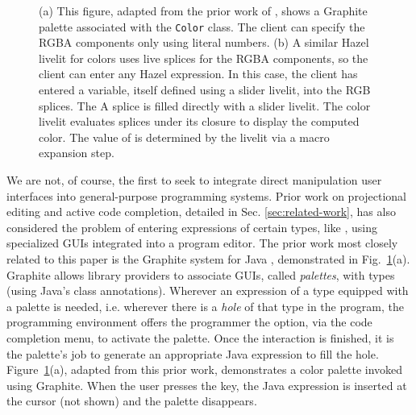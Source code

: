 \begin{figure}
  \caption{
  (a) This figure, adapted from the prior work of \citet{Graphite},
  shows a Graphite palette associated with the \texttt{Color} class.
  The client can specify the RGBA components only using literal numbers.
  (b) A similar Hazel livelit for colors uses live splices for the RGBA components,
  so the client can enter any Hazel expression.
  In this case, the client has entered a variable, itself defined using a slider livelit, into the RGB
  splices. The A splice is filled directly with a slider livelit.
  The color livelit evaluates splices under its closure to display the
  computed color.
  The value of  is determined by the livelit via a macro expansion step.}
  \label{fig:color}
\end{figure}

We are not, of course, the first to seek to integrate direct manipulation user interfaces
into general-purpose programming systems.
Prior work on projectional editing
and active code completion, detailed in Sec. \ref{sec:related-work},
has also considered the problem of entering expressions
of certain types, like ,
using specialized GUIs integrated into a program editor.
The prior work most closely related to this paper is the {Graphite} system for Java \cite{Graphite},
demonstrated in Fig.~\ref{fig:color}(a).
Graphite allows library providers to associate GUIs, called \emph{palettes}, with types (using Java's class annotations).
Wherever an expression of a type equipped with a palette is needed,
i.e. wherever there is a \emph{hole} of that type in the program,
the programming environment offers the programmer the option, via the code completion menu,
to activate the palette.
Once the interaction is finished, it is the palette's job to generate an
appropriate Java expression to fill the hole.
Figure~\ref{fig:color}(a), adapted from this prior work, demonstrates a color palette invoked using Graphite.
When the user presses the  key, the Java expression  is inserted at the cursor (not shown) and the palette disappears.

